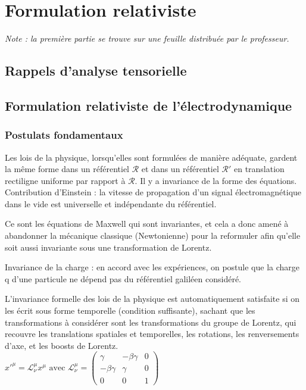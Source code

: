 \chapter{Formulation relativiste}


{\small \it Note : la première partie se trouve sur une feuille distribuée par le professeur.}
\section{Rappels d'analyse tensorielle}
\section{Formulation relativiste de l'électrodynamique}
\subsection{Postulats fondamentaux}

\begin{postulat}
	Les lois de la physique, lorsqu'elles sont formulées de manière adéquate, gardent la m\^eme forme dans un référentiel $\mathcal{R}$ et dans un référentiel $\mathcal{R}'$ en translation rectiligne uniforme par rapport à $\mathcal{R}$. Il y a invariance de la forme des équations.\\
	Contribution d'Einstein : la vitesse de propagation d'un signal électromagnétique dans le vide est universelle et indépendante du référentiel.
\end{postulat}

\begin{consequence}
	Ce sont les équations de Maxwell qui sont invariantes, et cela a donc amené à abandonner la mécanique classique (Newtonienne) pour la reformuler afin qu'elle soit aussi invariante sous une transformation de Lorentz.
\end{consequence}

\begin{postulat}
	Invariance de la charge : en accord avec les expériences, on postule que la charge q d'une particule ne dépend pas du référentiel galiléen considéré.
\end{postulat}

\begin{consequence}
	L'invariance formelle des lois de la physique est automatiquement satisfaite si on les écrit sous forme temporelle (condition suffisante), sachant que les transformations à considérer sont les transformations du groupe de Lorentz, qui recouvre les translations spatiales et temporelles, les rotations, les renversements d'axe, et les boosts de Lorentz.\\
\indent
$
	x'^{\mu}=\mathcal{L}^{\mu}_{\nu}x^{\mu} \text{ avec }\mathcal{L}^{\mu}_{\nu}=\begin{pmatrix}
	\gamma & -\beta\gamma & 0\\
	-\beta\gamma & \gamma & 0\\
	0 & 0 & 1
	\end{pmatrix}
$
\end{consequence}


